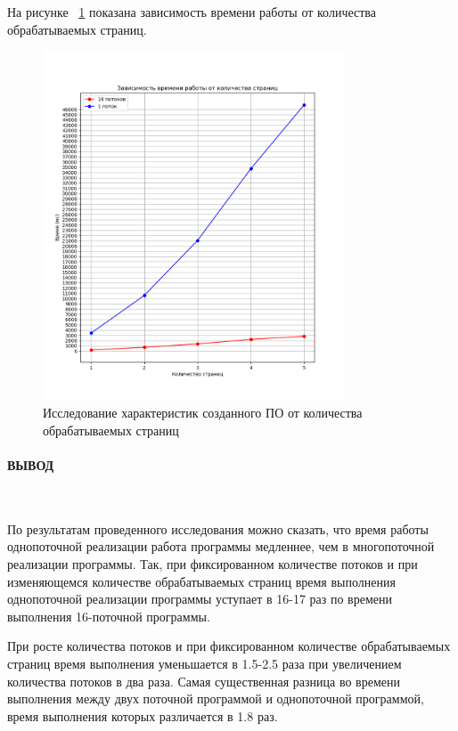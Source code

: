 На рисунке ~\ref{fig:image2} показана зависимость времени работы от количества
обрабатываемых страниц.

\begin{figure}[h!]
    \centering
    \includegraphics[width=0.8\textwidth]{images/image2}
    \caption{Исследование характеристик созданного ПО от количества обрабатываемых страниц}
    \label{fig:image2}
\end{figure}

\clearpage

\paragraph*{ВЫВОД} ${}$ \newline

По результатам проведенного исследования можно сказать, что время работы
однопоточной реализации работа программы медленнее, чем в многопоточной
реализации программы. Так, при фиксированном количестве потоков и при изменяющемся
количестве обрабатываемых страниц время выполнения однопоточной реализации программы
уступает в 16-17 раз по времени выполнения 16-поточной программы.

При росте количества потоков и при фиксированном количестве обрабатываемых
страниц время выполнения
уменьшается в 1.5-2.5 раза при увеличением количества потоков в два раза.
Самая существенная разница во времени выполнения между двух поточной программой
и однопоточной программой, время выполнения которых различается в 1.8 раз. 


